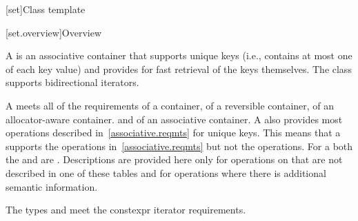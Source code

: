 [set]{Class template }

[set.overview]{Overview}

\pnum
{}%
A
is an associative container that supports unique keys (i.e., contains at most one of each key value) and
provides for fast retrieval of the keys themselves.
The
 class
supports bidirectional iterators.

\pnum
A  meets all of the requirements
of a container,
of a reversible container,
of an allocator-aware container. and
of an associative container.
A
also provides most operations described in~\ref{associative.reqmts}
for unique keys.
This means that a
supports the
operations in~\ref{associative.reqmts}
but not the
operations.
For a
both the
and
are
.
Descriptions are provided here only for operations on
that are not described in one of these tables
and for operations where there is additional semantic information.

\pnum
The types  and  meet
the constexpr iterator requirements.

